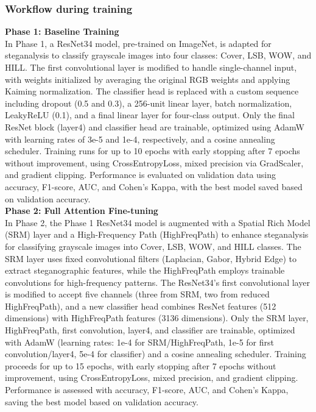 \documentclass[12pt]{article}
\begin{document}
\subsubsection{Workflow during training}
\textbf{Phase 1: Baseline Training}\vspace{0.5cm} \\
In Phase 1, a ResNet34 model, pre-trained on ImageNet, is adapted for steganalysis to classify grayscale images into four classes: Cover, LSB, WOW, and HILL. The first convolutional layer is modified to handle single-channel input, with weights initialized by averaging the original RGB weights and applying Kaiming normalization. The classifier head is replaced with a custom sequence including dropout (0.5 and 0.3), a 256-unit linear layer, batch normalization, LeakyReLU (0.1), and a final linear layer for four-class output. Only the final ResNet block (layer4) and classifier head are trainable, optimized using AdamW with learning rates of 3e-5 and 1e-4, respectively, and a cosine annealing scheduler. Training runs for up to 10 epochs with early stopping after 7 epochs without improvement, using CrossEntropyLoss, mixed precision via GradScaler, and gradient clipping. Performance is evaluated on validation data using accuracy, F1-score, AUC, and Cohen’s Kappa, with the best model saved based on validation accuracy.\vspace{0.5cm} \\
\textbf{Phase 2: Full Attention Fine-tuning} \vspace{0.5cm} \\
In Phase 2, the Phase 1 ResNet34 model is augmented with a Spatial Rich Model (SRM) layer and a High-Frequency Path (HighFreqPath) to enhance steganalysis for classifying grayscale images into Cover, LSB, WOW, and HILL classes. The SRM layer uses fixed convolutional filters (Laplacian, Gabor, Hybrid Edge) to extract steganographic features, while the HighFreqPath employs trainable convolutions for high-frequency patterns. The ResNet34’s first convolutional layer is modified to accept five channels (three from SRM, two from reduced HighFreqPath), and a new classifier head combines ResNet features (512 dimensions) with HighFreqPath features (3136 dimensions). Only the SRM layer, HighFreqPath, first convolution, layer4, and classifier are trainable, optimized with AdamW (learning rates: 1e-4 for SRM/HighFreqPath, 1e-5 for first convolution/layer4, 5e-4 for classifier) and a cosine annealing scheduler. Training proceeds for up to 15 epochs, with early stopping after 7 epochs without improvement, using CrossEntropyLoss, mixed precision, and gradient clipping. Performance is assessed with accuracy, F1-score, AUC, and Cohen’s Kappa, saving the best model based on validation accuracy.
\end{document}
